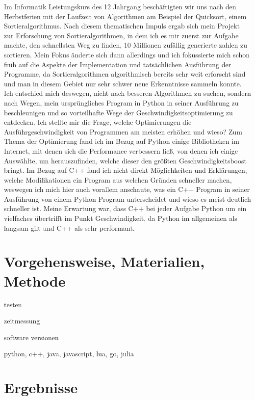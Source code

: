 \documentclass[12pt,a4paper]{article}
\begin{document}
Im Informatik Leistungskurs des 12 Jahrgang beschäftigten wir uns nach den Herbstferien mit
der Laufzeit von Algorithmen am Beispiel der Quicksort, einem Sortieralgorithmus.
Nach diesem thematischen Impuls ergab sich mein Projekt zur Erforschung von Sortieralgorithmen,
in dem ich es mir zuerst zur Aufgabe machte, den schnellsten Weg zu finden, 10 Millionen zufällig
generierte zahlen zu sortieren. Mein Fokus änderte sich dann allerdings und ich fokussierte mich
schon früh auf die Aspekte der Implementation und tatsächlichen Ausführung der Programme, da 
Sortieralgorithmen algorithmisch bereits sehr weit erforscht sind und man in diesem Gebiet nur
sehr schwer neue Erkenntnisse sammeln konnte.
Ich entschied mich deswegen, nicht nach besseren Algorithmen zu suchen, sondern nach Wegen, 
mein ursprüngliches Program in Python in seiner Ausführung zu beschleunigen und so vorteilhafte
Wege der Geschwindigkeitsoptimierung zu entdecken.
Ich stellte mir die Frage, welche Optimierungen die Ausführgeschwindigkeit von Programmen
am meisten erhöhen und wieso?
Zum Thema der Optimierung fand ich im Bezug auf Python einige Bibliotheken im Internet, mit
denen sich die Performance verbessern ließ, von denen ich einige Auswählte, um herauszufinden,
welche dieser den größten Geschwindigkeitsboost bringt.
Im Bezug auf C++ fand ich nicht direkt Möglichkeiten und Erklärungen, welche Modifikationen ein
Program aus welchen Gründen schneller machen, weswegen ich mich hier auch vorallem anschaute,
was ein C++ Program in seiner Ausführung von einem Python Program unterscheidet und wieso es
meist deutlich schneller ist.
Meine Erwartung war, dass C++ bei jeder Aufgabe Python um ein vielfaches übertrifft im Punkt Geschwindigkeit,
da Python im allgemeinen als langsam gilt und C++ als sehr performant.

\clearpage
\section*{Vorgehensweise, Materialien, Methode}
\label{sec:methode}

testen

zeitmessung


software versionen

python, c++, java, javascript, lua, go, julia



\clearpage
\section*{Ergebnisse}
\clearpage
\end{document}
